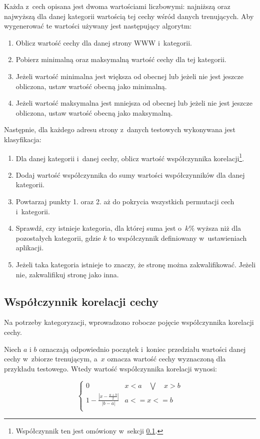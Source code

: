 \documentclass[a4paper,11pt]{article}
\newenvironment{definition}[1][Definicja]{\begin{trivlist}
\item[\hskip \labelsep {\bfseries #1}]}{\end{trivlist}}
\begin{document}
Każda z~cech opisana jest dwoma wartościami liczbowymi: najniższą oraz najwyższą dla danej kategorii wartością tej cechy wśród danych trenujących. Aby wygenerować te wartości używany jest następujący algorytm:

\begin{enumerate}
    \item Oblicz wartość cechy dla danej strony WWW i~kategorii.
    \item Pobierz minimalną oraz maksymalną wartość cechy dla tej kategorii.
    \item Jeżeli wartość minimalna jest większa od obecnej lub jeżeli nie jest jeszcze obliczona, ustaw wartość obecną jako minimalną.
    \item Jeżeli wartość maksymalna jest mniejsza od obecnej lub jeżeli nie jest jeszcze obliczona, ustaw wartość obecną jako maksymalną.
\end{enumerate}

Następnie, dla każdego adresu strony z~danych testowych wykonywana jest klasyfikacja:

\begin{enumerate}
    \item Dla danej kategorii i~danej cechy, oblicz wartość współczynnika korelacji\footnote{Współczynnik ten jest omówiony w~sekcji \ref{sec:correlation_index}.}.
    \item Dodaj wartość współczynnika do sumy wartości współczynników dla danej kategorii.
    \item Powtarzaj punkty 1. oraz 2. aż do pokrycia wszystkich permutacji cech i~kategorii.
    \item Sprawdź, czy istnieje kategoria, dla której suma jest o~$k \%$ wyższa niż dla pozostałych kategorii, gdzie $k$ to współczynnik definiowany w~ustawieniach aplikacji.
    \item Jeżeli taka kategoria istnieje to znaczy, że stronę można zakwalifikować. Jeżeli nie, zakwalifikuj stronę jako inna.
\end{enumerate}

\subsection{Współczynnik korelacji cechy}
\label{sec:correlation_index}

Na potrzeby kategoryzacji, wprowadzono robocze pojęcie współczynnika korelacji cechy.

\begin{definition}
    Niech $a$ i $b$ oznaczają odpowiednio początek i~koniec przedziału wartości danej cechy w~zbiorze trenującym, a~$x$ oznacza wartość cechy wyznaczoną dla przykładu testowego. Wtedy wartość współczynnika korelacji wynosi:
    
    \begin{equation}
        \begin{cases}
            0 & x < a \quad \bigvee \quad x > b \\
            1 - \frac{|{x - \frac{a+b}{2}}|}{|{b - a}|} & a <= x <= b \\
        \end{cases}
    \end{equation}
\end{definition}
\end{document}
